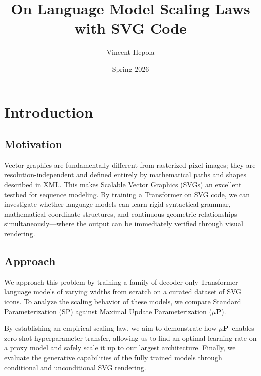 \documentclass[11pt]{article}
\newcommand{\mup}{$\mu$\textbf{P}}
\begin{document}
\title{On Language Model Scaling Laws with SVG Code}
\date{Spring 2026}
\author{Vincent Hepola}


\maketitle
\tableofcontents




\section{Introduction}

\subsection{Motivation}

Vector graphics are fundamentally different from rasterized pixel images;
they are resolution-independent and defined entirely by mathematical paths and shapes described in XML.
This makes Scalable Vector Graphics (SVGs) an excellent testbed for sequence modeling.
By training a Transformer on SVG code, we can investigate whether language models
can learn rigid syntactical grammar, mathematical coordinate structures, and continuous geometric
relationships simultaneously---where the output can be immediately verified through visual rendering.


\subsection{Approach}

We approach this problem by training a family of decoder-only Transformer language models of varying
widths from scratch on a curated dataset of SVG icons. To analyze the scaling behavior of these models,
we compare Standard Parameterization (SP) against Maximal Update Parameterization (\mup).

By establishing an empirical scaling law, we aim to demonstrate how \mup~enables zero-shot hyperparameter transfer,
allowing us to find an optimal learning rate on a proxy model and safely scale it up to our largest architecture.
Finally, we evaluate the generative capabilities of the fully trained models through conditional and unconditional SVG rendering.

\end{document}
